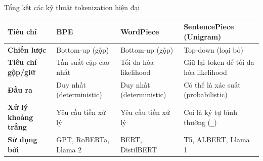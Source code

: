 \begin{assess}{Tổng kết các kỹ thuật tokenization hiện đại}
\begin{tabularx}{\linewidth}{|l|X|X|X|}
    \hline
    \textbf{Tiêu chí} & \textbf{BPE} & \textbf{WordPiece} & \textbf{SentencePiece (Unigram)} \\
    \hline
    \textbf{Chiến lược} & Bottom-up (gộp) & Bottom-up (gộp) & Top-down (loại bỏ) \\
    \hline
    \textbf{Tiêu chí gộp/giữ} & Tần suất cặp cao nhất & Tối đa hóa likelihood & Giữ lại token để tối đa hóa likelihood \\
    \hline
    \textbf{Đầu ra} & Duy nhất (deterministic) & Duy nhất (deterministic) & Có thể là xác suất (probabilistic) \\
    \hline
    \textbf{Xử lý khoảng trắng} & Yêu cầu tiền xử lý & Yêu cầu tiền xử lý & Coi là ký tự bình thường (\texttt{\_}) \\
    \hline
    \textbf{Sử dụng bởi} & GPT, RoBERTa, Llama 2 & BERT, DistilBERT & T5, ALBERT, Llama 1 \\
    \hline
\end{tabularx}
\end{assess}